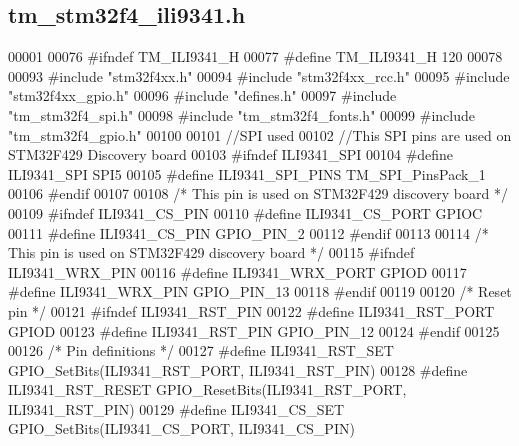 \hypertarget{tm__stm32f4__ili9341_8h_source}{}\subsection{tm\+\_\+stm32f4\+\_\+ili9341.\+h}

\begin{DoxyCode}
00001 
00076 \textcolor{preprocessor}{#ifndef TM\_ILI9341\_H}
00077 \textcolor{preprocessor}{#define TM\_ILI9341\_H 120}
00078 
00093 \textcolor{preprocessor}{#include "stm32f4xx.h"}
00094 \textcolor{preprocessor}{#include "stm32f4xx\_rcc.h"}
00095 \textcolor{preprocessor}{#include "stm32f4xx\_gpio.h"}
00096 \textcolor{preprocessor}{#include "defines.h"}
00097 \textcolor{preprocessor}{#include "tm\_stm32f4\_spi.h"}
00098 \textcolor{preprocessor}{#include "tm\_stm32f4\_fonts.h"}
00099 \textcolor{preprocessor}{#include "tm\_stm32f4\_gpio.h"}
00100 
00101 \textcolor{comment}{//SPI used}
00102 \textcolor{comment}{//This SPI pins are used on STM32F429 Discovery board}
00103 \textcolor{preprocessor}{#ifndef ILI9341\_SPI}
00104 \textcolor{preprocessor}{#define ILI9341\_SPI                 SPI5}
00105 \textcolor{preprocessor}{#define ILI9341\_SPI\_PINS            TM\_SPI\_PinsPack\_1}
00106 \textcolor{preprocessor}{#endif}
00107 
00108 \textcolor{comment}{/* This pin is used on STM32F429 discovery board */}
00109 \textcolor{preprocessor}{#ifndef ILI9341\_CS\_PIN}
00110 \textcolor{preprocessor}{#define ILI9341\_CS\_PORT             GPIOC}
00111 \textcolor{preprocessor}{#define ILI9341\_CS\_PIN              GPIO\_PIN\_2}
00112 \textcolor{preprocessor}{#endif}
00113 
00114 \textcolor{comment}{/* This pin is used on STM32F429 discovery board */}
00115 \textcolor{preprocessor}{#ifndef ILI9341\_WRX\_PIN}
00116 \textcolor{preprocessor}{#define ILI9341\_WRX\_PORT            GPIOD}
00117 \textcolor{preprocessor}{#define ILI9341\_WRX\_PIN             GPIO\_PIN\_13}
00118 \textcolor{preprocessor}{#endif}
00119 
00120 \textcolor{comment}{/* Reset pin */}
00121 \textcolor{preprocessor}{#ifndef ILI9341\_RST\_PIN}
00122 \textcolor{preprocessor}{#define ILI9341\_RST\_PORT            GPIOD}
00123 \textcolor{preprocessor}{#define ILI9341\_RST\_PIN             GPIO\_PIN\_12}
00124 \textcolor{preprocessor}{#endif}
00125 
00126 \textcolor{comment}{/* Pin definitions */}
00127 \textcolor{preprocessor}{#define ILI9341\_RST\_SET             GPIO\_SetBits(ILI9341\_RST\_PORT, ILI9341\_RST\_PIN)}
00128 \textcolor{preprocessor}{#define ILI9341\_RST\_RESET           GPIO\_ResetBits(ILI9341\_RST\_PORT, ILI9341\_RST\_PIN)}
00129 \textcolor{preprocessor}{#define ILI9341\_CS\_SET              GPIO\_SetBits(ILI9341\_CS\_PORT, ILI9341\_CS\_PIN)}

\end{DoxyCode}
